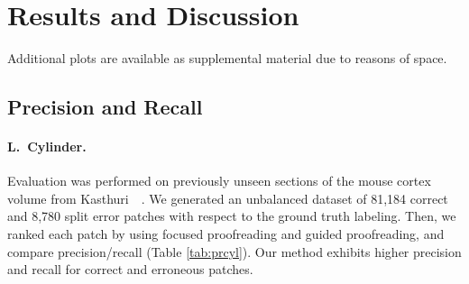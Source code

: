 \section{Results and Discussion}

Additional plots are available as supplemental material due to reasons of space. 

\subsection{Precision and Recall}

\paragraph{L.~Cylinder.} Evaluation was performed on previously unseen sections of the mouse cortex volume from Kasthuri~\etal~\cite{kasthuri2015saturated}. We generated an unbalanced dataset of 81,184 correct and 8,780 split error patches with respect to the ground truth labeling. Then, we ranked each patch by using focused proofreading and guided proofreading, and compare precision/recall (Table \ref{tab:prcyl}). Our method exhibits higher precision and recall for correct and erroneous patches.

\begin{table}[t]
\caption{Classifier comparison on an unbalanced test set of the L.~Cylinder volume.}%
\label{tab:prcyl}
\end{table}

